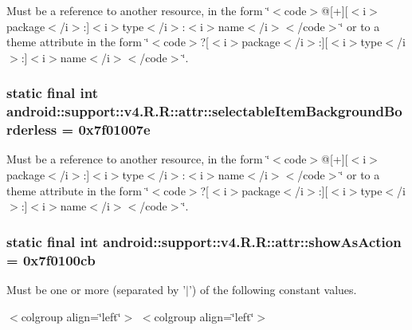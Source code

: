 Must be a reference to another resource, in the form \char`\"{}$<$code$>$@\mbox{[}+\mbox{]}\mbox{[}$<$i$>$package$<$/i$>$:\mbox{]}$<$i$>$type$<$/i$>$:$<$i$>$name$<$/i$>$$<$/code$>$\char`\"{} or to a theme attribute in the form \char`\"{}$<$code$>$?\mbox{[}$<$i$>$package$<$/i$>$:\mbox{]}\mbox{[}$<$i$>$type$<$/i$>$:\mbox{]}$<$i$>$name$<$/i$>$$<$/code$>$\char`\"{}. \hypertarget{classandroid_1_1support_1_1v4_1_1_r_1_1attr_c6f224606df449aae4248b87acc74f65}{
\subsubsection[{selectableItemBackgroundBorderless}]{\setlength{\rightskip}{0pt plus 5cm}static final int android::support::v4.R.R::attr::selectableItemBackgroundBorderless = 0x7f01007e}}
\label{classandroid_1_1support_1_1v4_1_1_r_1_1attr_c6f224606df449aae4248b87acc74f65}


Must be a reference to another resource, in the form \char`\"{}$<$code$>$@\mbox{[}+\mbox{]}\mbox{[}$<$i$>$package$<$/i$>$:\mbox{]}$<$i$>$type$<$/i$>$:$<$i$>$name$<$/i$>$$<$/code$>$\char`\"{} or to a theme attribute in the form \char`\"{}$<$code$>$?\mbox{[}$<$i$>$package$<$/i$>$:\mbox{]}\mbox{[}$<$i$>$type$<$/i$>$:\mbox{]}$<$i$>$name$<$/i$>$$<$/code$>$\char`\"{}. \hypertarget{classandroid_1_1support_1_1v4_1_1_r_1_1attr_bc7779682c77f36eee2765e85ff479fb}{
\subsubsection[{showAsAction}]{\setlength{\rightskip}{0pt plus 5cm}static final int android::support::v4.R.R::attr::showAsAction = 0x7f0100cb}}
\label{classandroid_1_1support_1_1v4_1_1_r_1_1attr_bc7779682c77f36eee2765e85ff479fb}


Must be one or more (separated by '$|$') of the following constant values. \begin{TabularC}{0}
\hline
\end{TabularC}
$<$colgroup align=\char`\"{}left\char`\"{}$>$ $<$colgroup align=\char`\"{}left\char`\"{}$>$ 

